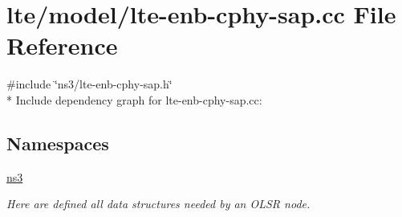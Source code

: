 \hypertarget{lte-enb-cphy-sap_8cc}{}\section{lte/model/lte-\/enb-\/cphy-\/sap.cc File Reference}
\label{lte-enb-cphy-sap_8cc}
{\ttfamily \#include \char`\"{}ns3/lte-\/enb-\/cphy-\/sap.\+h\char`\"{}}\\*
Include dependency graph for lte-\/enb-\/cphy-\/sap.cc\+:
\subsection*{Namespaces}
\begin{DoxyCompactItemize}
\item 
 \hyperlink{namespacens3}{ns3}
\begin{DoxyCompactList}\small\item\em Here are defined all data structures needed by an O\+L\+SR node. \end{DoxyCompactList}\end{DoxyCompactItemize}

